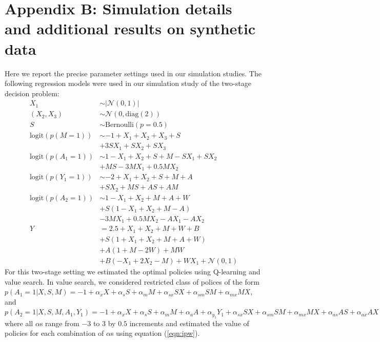 \documentclass[letterpaper]{article} %
\begin{document}
\section*{Appendix B: Simulation details and additional results on synthetic data} 
Here we report the precise parameter settings used in our simulation studies. The following regression models were used in our simulation study of the two-stage decision problem:
{\small
	\begin{align*}
	X_1 &\sim |  \mathcal{N}(0, 1) | 
	\nonumber \\
	(X_2, X_3)  &\sim  \mathcal{N}(0, \text{diag}(2)) 
	\nonumber \\ 
	S  &\sim \text{Bernoulli}(p = 0.5) 
	\nonumber \\  
	\text{logit}(p(M = 1)) &\sim -1 + X_1 + X_2 + X_3 + S\\
										&+ 3SX_1 + SX_2 + SX_3
	\nonumber \\
	\text{logit}(p(A_1 = 1)) &\sim 1 - X_1 + X_2 + S + M - SX_1 + SX_2\\
											&+ MS - 3MX_1 + 0.5MX_2 
	\nonumber \\
	\text{logit}(p(Y_1 = 1)) &\sim -2 + X_1 + X_2 + S + M + A\\
											&+ SX_2 + MS + AS + AM 
	\nonumber \\
	\text{logit}(p(A_2 = 1)) &\sim 1 - X_1 + X_2  + M + A + W\\
											&+ S(1 - X_1 + X_2 + M - A) \\
											&- 3MX_1 + 0.5MX_2 - AX_1 - AX_2 
	\nonumber \\
	Y& = 2.5 + X_1 + X_2 + M + W + B\\
		&+ S(1+ X_1+  X_2 + M + A + W) \\ 
		&+ A(1 + M - 2W) + MW\\
		&+  B(-X_1 + 2X_2 - M) + WX_1 + \mathcal{N}(0, 1) 
	\end{align*}
}%
For this two-stage setting we estimated the optimal policies using Q-learning and value search. 
In value search, we considered restricted class of polices of the form $p(A_1 = 1 | X, S, M) = -1 + \alpha_x X + \alpha_s S + \alpha_m M +   \alpha_{sx} SX + \alpha_{sm} SM + \alpha_{mx} MX $, and $p(A_2 = 1 | X, S, M, A_1, Y_1) = -1 + \alpha_x X + \alpha_s S + \alpha_m M +  \alpha_a A + \alpha_{y_1} Y_1 + \alpha_{sx} SX + \alpha_{sm} SM + \alpha_{mx} MX  + \alpha_{as} AS + \alpha_{ax} AX$ where all $\alpha$s range from $-3$ to $3$ by $0.5$ increments and estimated the value of policies for each combination of $\alpha$s using equation (\ref{eqn:ipw}). 
\end{document}
